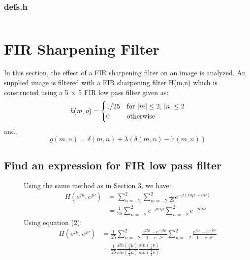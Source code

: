 \documentclass{article}
\DeclarePairedDelimiter{\abs}{\lvert}{\rvert}
\begin{document}
\subsubsection{defs.h}
\inputminted[tabsize=4]{c}{defs.h}


\section{FIR Sharpening Filter}

In this section, the effect of a FIR sharpening filter on an image is analyzed. An supplied image is filtered with a FIR sharpening filter H(m,n) which is constructed using a 5 $\times$ 5 FIR low pass filter given as:
\begin{equation}
\textit{h}(\textit{m},\textit{n}) = \begin{cases}1/25 & \text{for } \abs{m} \le 2 \text{, } \abs{n} \le 2 \\
0 & \text{otherwise}\\
\end{cases}
\end{equation}
and,
\begin{equation}
\textit{g}(\textit{m},\textit{n}) = \delta(\textit{m},\textit{n})+\lambda(\delta(\textit{m},\textit{n})-\textit{h}(\textit{m},\textit{n}))
\end{equation}

\subsection{Find an expression for FIR low pass filter}
\begin{description}
\item[]
Using the same method as in Section 3, we have:
\begin{align*}
H(e^{j\mu},e^{j\nu}) &= {\sum_{n=-2}^{2}\sum_{m=-2}^{2}}\frac{1}{25}e^{-j(m\mu+n\nu)} \\
					 &= \frac{1}{25}{\sum_{n=-2}^{2}}e^{-jm\mu}{\sum_{n=-2}^{2}}e^{-jm\nu}
\end{align*}
Using equation (2):
\begin{align*}
H(e^{j\mu},e^{j\nu}) &= \frac{1}{25}{{\sum_{n=-2}^{2}}\frac{e^{j2\mu}-e^{-j3\mu}}{1-e^{-j\mu}}}
{{\sum_{n=-2}^{2}}\frac{e^{j2\nu}-e^{-j3\nu}}{1-e^{-j\nu}}} \\
					 &= \frac{1}{25}{\frac{sin(\frac{5}{2}\mu)}{sin(\frac{1}{2}\mu)}}
                     {\frac{sin(\frac{5}{2}\nu)}{sin(\frac{1}{2}\nu)}}
\end{align*}
\end{description}
\end{document}
